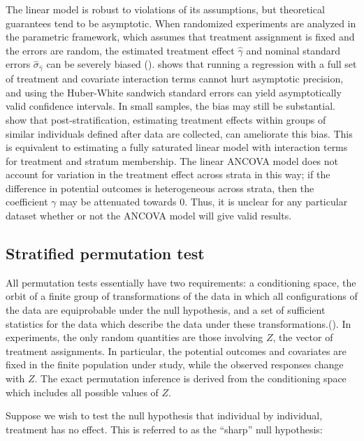 \documentclass[12pt]{article}
\begin{document}
The linear model is robust to violations of its assumptions, but theoretical guarantees tend to be asymptotic.
When randomized experiments are analyzed in the parametric framework, which assumes that treatment assignment is fixed and the errors are random,
the estimated treatment effect $\hat{\gamma}$ and nominal standard errors $\hat{\sigma}_{\hat{\gamma}}$ can be severely biased (\cite{freedman_regression_2008, lin_agnostic_2013}).
\cite{lin_agnostic_2013} shows that running a regression with a full set of treatment and covariate interaction terms cannot hurt asymptotic precision, and using the Huber-White sandwich standard errors can yield asymptotically valid confidence intervals.
In small samples, the bias may still be substantial.
\cite{miratrix_adjusting_2013} show that post-stratification, estimating treatment effects within groups of similar individuals defined after data are collected, can ameliorate this bias.
This is equivalent to estimating a fully saturated linear model with interaction terms for treatment and stratum membership.
The linear ANCOVA model does not account for variation in the treatment effect across strata in this way;
if the difference in potential outcomes is heterogeneous across strata, then the coefficient $\gamma$ may be attenuated towards 0.
Thus, it is unclear for any particular dataset whether or not the ANCOVA model will give valid results.


\subsection{Stratified permutation test}\label{subsec:strat_perm_test}
All permutation tests essentially have two requirements: a conditioning space, the orbit of a finite group of transformations of the data in which all configurations of the data are equiprobable under the null hypothesis, and a set of sufficient statistics for the data which describe the data under these transformations.(\cite{pesarin_permutation_2010}).
In experiments, the only random quantities are those involving $Z$, the vector of treatment assignments.
In particular, the potential outcomes and covariates are fixed in the finite population under study, while the observed responses change with $Z$.
The exact permutation inference is derived from the conditioning space which includes all possible values of $Z$.

Suppose we wish to test the null hypothesis that individual by individual, treatment has no effect.
This is referred to as the ``sharp'' null hypothesis:
\end{document}
